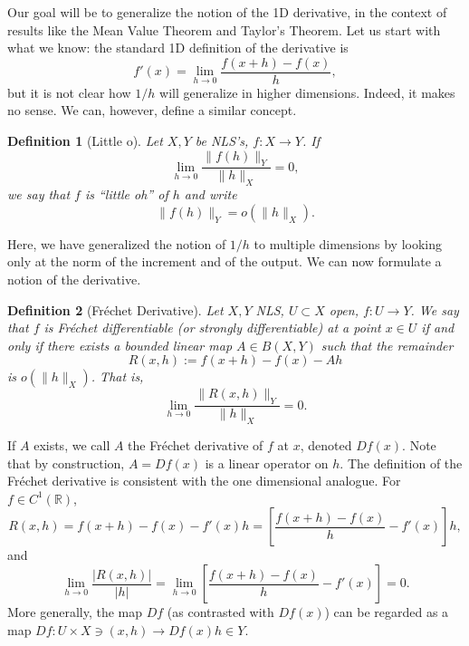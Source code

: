 \documentclass[letterpaper,twoside,12pt]{article}
\theoremstyle{mystyle}
\newtheorem{definition}{Definition}[section]
\newcommand{\R}{{\mathbb R}}
\newcommand{\cg}{\color{gray}}
\newcommand{\cbk}{\color{black}}
\begin{document}
  Our goal will be to generalize the notion of the 1D derivative, in the context of results like the Mean Value Theorem and Taylor's Theorem. Let us start with what we know: the standard 1D definition of the derivative is
  \begin{equation}
    f'(x) = \lim_{h\to 0} \frac{f(x+h) - f(x)}{h},
  \end{equation}
  but it is not clear how $1/h$ will generalize in higher dimensions. Indeed, it makes no sense. We can, however, define a similar concept. 
  \begin{definition}[Little o]
    Let $X, Y$ be NLS's, $f : X \to Y$. If 
    \[\lim_{h \to 0} \frac{\|f(h)\|_Y}{\|h\|_X} = 0,\]
    we say that $f$ is ``little oh'' of $h$ and write 
    \[\|f(h)\|_Y = o\left( \|h\|_X \right).\]
  \end{definition}
  \cg
    Here, we have generalized the notion of $1/h$ to multiple dimensions by looking only at the norm of the increment and of the output. 
  \cbk
  We can now formulate a notion of the derivative.
  \begin{definition}[Fr\'echet Derivative]
    Let $X, Y$ NLS, $U\subset X$ open, $f: U \to Y$. We say that $f$ is Fr\'echet differentiable (or strongly differentiable) at a point $x \in U$ if and only if there exists a bounded linear map $A \in B(X, Y)$ such that the remainder
    \[R(x,h) := f(x+h) - f(x) - Ah\]
    is $o\left( \|h\|_X \right)$. That is, 
    \[\lim_{h\to 0}\frac{\|R(x,h)\|_Y}{\|h\|_X} = 0.\]
  \end{definition}
  If $A$ exists, we call $A$ the Fr\'echet derivative of $f$ at $x$, denoted $Df(x)$. Note that by construction, $A = Df(x)$ is a linear operator on $h$. 
  The definition of the Fr\'echet derivative is consistent with the one dimensional analogue. For $f \in C^1 (\R)$, 
  \begin{equation}
    R\left( {x,h} \right) = f\left( {x + h} \right) - f\left( x \right) - f'\left( x \right)h = \left[ {\frac{{f\left( {x + h} \right) - f\left( x \right)}}{h} - f'\left( x \right)} \right]h,
  \end{equation}
  and 
  \begin{equation}
    \mathop {\lim }\limits_{h \to 0} \frac{{\left| {R\left( {x,h} \right)} \right|}}{{\left| h \right|}} = \mathop {\lim }\limits_{h \to 0} \left[ {\frac{{f\left( {x + h} \right) - f\left( x \right)}}{h} - f'\left( x \right)} \right] = 0.
  \end{equation}
  More generally, the map $Df$ (as contrasted with $Df(x)$) can be regarded as a map $Df: U\times X \ni (x, h) \to Df(x)h \in Y$. 
\end{document}

